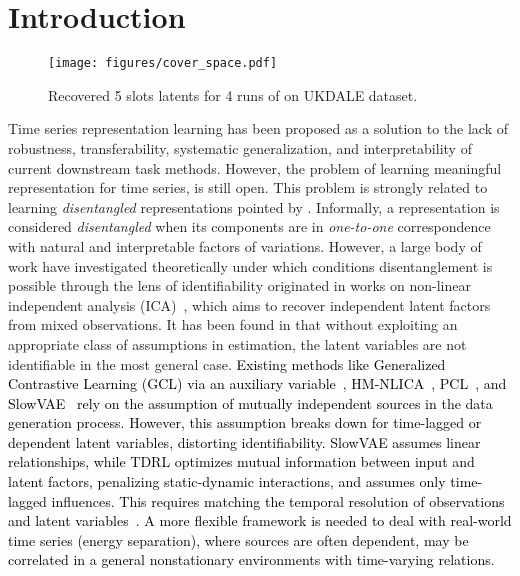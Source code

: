 \documentclass{article} %
\theoremstyle{plain}
\theoremstyle{definition}
\theoremstyle{remark}
\numberwithin{equation}{section}
\begin{document}
\section{Introduction}\label{sec:introduction}
\begin{wrapfigure}{r}{0.40\textwidth}
    \centering
    \vspace{-0.5cm}
    \texttt{[image: figures/cover\_space.pdf]}
    \vspace{-0.8cm}
    \caption{Recovered 5 slots latents for 4 runs of \TimeCSL on UKDALE dataset.}
    \label{fig:identifiability_presentations}
    \vspace{-0.31cm}
\end{wrapfigure}
Time series representation learning has been proposed as a solution to the lack of robustness, transferability, systematic generalization, and interpretability of current downstream task methods. However, the problem of learning meaningful representation for time series, is still open. This problem is strongly related to learning \emph{disentangled} representations pointed by \citet{bengio2013representation}. Informally, a representation is considered \emph{disentangled} when its components are in \emph{one-to-one} correspondence with natural and interpretable factors of variations. However, a large body of work have investigated theoretically under which conditions disentanglement is possible through the lens of identifiability originated in works on non-linear independent analysis (ICA)~\citep{comon1994independent, hyvarinen2017nonlinear, hyvarinen2019nonlinear, khemakhem2020variational}, which aims to recover independent latent factors from mixed observations. It has been found in \citep{locatello2019challenging, van2008visualizing, dittadi2021sim2real_dis, montero2021disGen, lachapelle2022disentanglement} that without exploiting an appropriate class of assumptions in
estimation, the latent variables are not identifiable in the most general case. \textcolor{black}{Existing methods like Generalized Contrastive Learning (GCL) via an auxiliary variable~\citep{hyvarinen2019nonlinear},  HM-NLICA~\citep{halva2020hidden}, PCL~\citep{PCL17}, and SlowVAE~\citep{klindt2020towards} rely on the assumption of mutually independent sources in the data generation process. However, this assumption breaks down for time-lagged or dependent latent variables, distorting identifiability. SlowVAE assumes linear relationships, while TDRL optimizes mutual information between input and latent factors, penalizing static-dynamic interactions, and assumes only time-lagged influences. This requires matching the temporal resolution of observations and latent variables~\citep{yao2022temporally}. A more flexible framework is needed to deal with real-world time series (\eg energy separation), where sources are often dependent, may be correlated in a general nonstationary environments with time-varying relations.}
\end{document}
